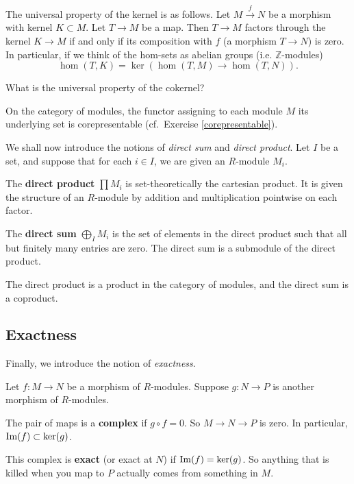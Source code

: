 \begin{exercise} \label{univpropertykernel} 
The universal property of the kernel is as follows. Let $M \stackrel{f}{\to }
N$ be a morphism with kernel $K \subset M$. Let $T \to M$ be a map. Then $T \to M$ factors through the
kernel $K \to M$ if and only if its composition with $f$ (a morphism $T \to N$) is zero. 
In particular, if we think of the hom-sets as abelian groups (i.e.
$\mathbb{Z}$-modules)
\[ \hom( T,K) = \ker\left( \hom(T, M) \to \hom(T, N) \right). \]
\end{exercise} 
\begin{exercise} 
What is the universal property of the cokernel?
\end{exercise} 

\begin{exercise} 
On the category of modules, the functor assigning to each module $M$ its
underlying set is corepresentable (cf.\ Exercise \ref{corepresentable}).
\end{exercise} 

We shall now introduce the notions of \emph{direct sum} and \emph{direct
product}. Let $I$ be a set, and suppose that for each $i \in I$, we are given
an $R$-module $M_i$.

\begin{definition} 
The \textbf{direct product} $\prod M_i$ is set-theoretically the cartesian product. It is given
the structure of an $R$-module by addition and multiplication pointwise on
each factor. 
\end{definition} 
\begin{definition} 
The \textbf{direct sum} $\bigoplus_I M_i$ is the set of elements in the direct
product such that all but finitely many entries are zero. The direct sum is a
submodule of the direct product.
\end{definition} 


\begin{exercise} 
The direct product is a product in the category of modules, and the direct sum
is a coproduct.
\end{exercise} 


\subsection{Exactness}
Finally, we introduce the notion of \emph{exactness}. 
\begin{definition} 
Let $f: M \to N$ be a morphism of $R$-modules.  Suppose $g: N \to P$ is another morphism of
$R$-modules.  

The pair of maps is a \textbf{complex} if $g \circ f = 0$. So $M \to N \to P$
is zero.
In particular, $\mathrm{Im}(f) \subset \ker(g)$. 

This complex is \textbf{exact} (or exact at $N$) if $\mathrm{Im}(f) = \ker(g)$. So
anything that is killed when you map to $P$ actually comes from something in
$M$. 

\end{definition} 


